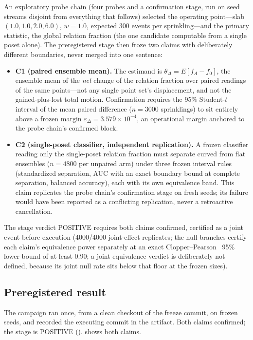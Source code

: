 An exploratory probe chain (four probes and a confirmation stage, run on seed
streams disjoint from everything that follows) selected the operating
point---slab $(1.0, 1.0, 2.0, 6.0)$, $w = 1.0$, expected 300 events per
sprinkling---and the primary statistic, the global relation fraction (the one
candidate computable from a single poset alone). The preregistered stage then
froze two claims with deliberately different boundaries, never merged into
one sentence:
\begin{itemize}
\item \textbf{C1 (paired ensemble mean).} The estimand is
  $\theta_\Delta = E[f_A - f_0]$, the ensemble mean of the \emph{net} change
  of the relation fraction over paired readings of the same points---not any
  single point set's displacement, and not the gained-plus-lost total motion.
  Confirmation requires the 95\% Student-$t$ interval of the mean paired
  difference ($n = 3000$ sprinklings) to sit entirely above a frozen margin
  $\varepsilon_\Delta = 3.579\times10^{-4}$, an operational margin anchored
  to the probe chain's confirmed block.
\item \textbf{C2 (single-poset classifier, independent replication).} A
  frozen classifier reading only the single-poset relation fraction must
  separate curved from flat ensembles ($n = 4800$ per unpaired arm) under
  three frozen interval rules (standardized separation, AUC with an exact
  boundary bound at complete separation, balanced accuracy), each with its
  own equivalence band. This claim replicates the probe chain's confirmation
  stage on fresh seeds; its failure would have been reported as a conflicting
  replication, never a retroactive cancellation.
\end{itemize}

The stage verdict POSITIVE requires both claims confirmed, certified as a
joint event before execution (4000/4000 joint-effect replicates; the null
branches certify each claim's equivalence power separately at an exact
Clopper--Pearson~\cite{clopperpearson1934} 95\% lower bound of at least 0.90; a joint equivalence
verdict is deliberately not defined, because its joint null rate sits below
that floor at the frozen sizes).

\subsection{Preregistered result}
\label{sec:preregresult}

The campaign ran once, from a clean checkout of the freeze commit, on frozen
seeds, and recorded the executing commit in the artifact. Both claims
confirmed; the stage is POSITIVE ().
 shows both claims.

